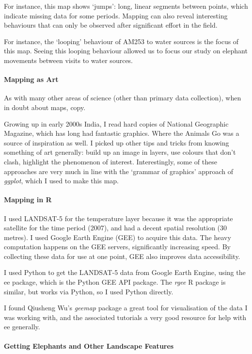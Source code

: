 	For instance, this map shows `jumps': long, linear segments between points, which indicate missing data for some periods. Mapping can also reveal interesting behaviours that can only be observed after significant effort in the field.

	For instance, the `looping' behaviour of AM253 to water sources is the focus of this map. Seeing this looping behaviour allowed us to focus our study on elephant movements between visits to water sources.

	\paragraph*{Mapping as Art}

	As with many other areas of science (other than primary data collection), when in doubt about maps, copy.

	Growing up in early 2000s India, I read hard copies of National Geographic Magazine, which has long had fantastic graphics. Where the Animals Go was a source of inspiration as well. I picked up other tips and tricks from knowing something of art generally: build up an image in layers, use colours that don't clash, highlight the phenomenon of interest. Interestingly, some of these approaches are very much in line with the `grammar of graphics' approach of \textit{ggplot}, which I used to make this map.

	\paragraph*{Mapping in R}

	I used LANDSAT-5 for the temperature layer because it was the appropriate satellite for the time period (2007), and had a decent spatial resolution (30 metres). I used Google Earth Engine (GEE) to acquire this data. The heavy computation happens on the GEE servers, significantly increasing speed. By collecting these data for use at one point, GEE also improves data accessibility.

	I used Python to get the LANDSAT-5 data from Google Earth Engine, using the ee package, which is the Python GEE API package. The \textit{rgee} R package is similar, but works via Python, so I used Python directly.

	I found Qiusheng Wu's \textit{geemap} package a great tool for visualisation of the data I was working with, and the associated tutorials a very good resource for help with ee generally.

	\paragraph*{Getting Elephants and Other Landscape Features}

